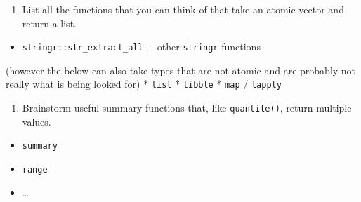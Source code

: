 \documentclass[]{book}
\providecommand{\tightlist}{%
  \setlength{\itemsep}{0pt}\setlength{\parskip}{0pt}}
\theoremstyle{definition}
\theoremstyle{definition}
\theoremstyle{definition}
\theoremstyle{remark}
\begin{document}
\begin{enumerate}
\def\labelenumi{\arabic{enumi}.}
\tightlist
\item
  List all the functions that you can think of that take an atomic
  vector and return a list.
\end{enumerate}

\begin{itemize}
\tightlist
\item
  \texttt{stringr::str\_extract\_all} + other \texttt{stringr} functions
\end{itemize}

(however the below can also take types that are not atomic and are
probably not really what is being looked for) * \texttt{list} *
\texttt{tibble} * \texttt{map} / \texttt{lapply}

\begin{enumerate}
\def\labelenumi{\arabic{enumi}.}
\tightlist
\item
  Brainstorm useful summary functions that, like \texttt{quantile()},
  return multiple values.
\end{enumerate}

\begin{itemize}
\tightlist
\item
  \texttt{summary}
\item
  \texttt{range}
\item
  \ldots{}
\end{itemize}
\end{document}
